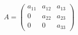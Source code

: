 \[  A = \begin{pmatrix}
  a_{11} & a_{12} & a_{13} \\
  0 & a_{22} & a_{23} \\
  0 & 0 & a_{33}
\end{pmatrix}  \]
